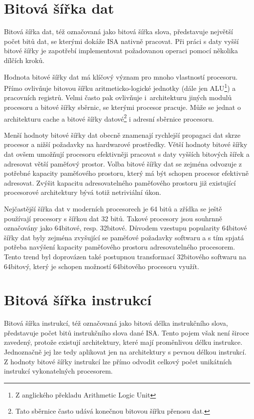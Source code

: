 \documentclass[
  digital, %
  color,   %
  table,   %
  twoside, %
  nolof,   %
  nolot,   %
]{fithesis3}
\begin{document}
\section{Bitová šířka dat}
Bitová šířka dat, též označovaná jako bitová šířka slova, představuje největší počet bitů dat, se kterými dokáže ISA nativně pracovat. Při práci s daty vyšší bitové šířky je zapotřebí implementovat požadovanou operaci pomocí několika dílčích kroků.

Hodnota bitové šířky dat má klíčový význam pro mnoho vlastností procesoru. Přímo ovlivňuje bitovou šířku aritmeticko-logické jednotky (dále jen ALU\footnote{Z anglického překladu Arithmetic Logic Unit}) a pracovních registrů. Velmi často pak ovlivňuje i~architekturu jiných modulů procesoru a bitové šířky sběrnic, se kterými procesor pracuje. Může se jednat o architekturu cache a bitové šířky datové\footnote{Tato sběrnice často udává konečnou bitovou šířku přenosu dat.} i adresní sběrnice procesoru.

Menší hodnoty bitové šířky dat obecně znamenají rychlejší propagaci dat skrze procesor a nižší požadavky na hardwarové prostředky. Větší hodnoty bitové šířky dat ovšem umožňují procesoru efektivněji pracovat s daty vyšších bitových šířek a adresovat větší paměťový prostor. Volba bitové šířky dat se zejména odvozuje z potřebné kapacity paměťového prostoru, který má být schopen procesor efektivně adresovat. Zvýšit kapacitu adresovatelného paměťového prostoru již existující procesorové architektury bývá totiž netriviální úkon.

Nejčastější šířka dat v moderních procesorech je 64 bitů a zřídka se ještě používají procesory s šířkou dat 32 bitů. Takové procesory jsou souhrnně označovány jako 64bitové, resp. 32bitové. Důvodem vzestupu popularity 64bitové šířky dat byly zejména zvyšující se paměťové požadavky softwaru a s tím spjatá potřeba navýšení kapacity paměťového prostoru adresovatelného procesorem. Tento trend byl doprovázen také postupnou transformací 32bitového softwaru na 64bitový, který je schopen možností 64bitového procesoru využít.

\section{Bitová šířka instrukcí}
Bitová šířka instrukcí, též označovaná jako bitová délka instrukčního slova, představuje počet bitů instrukčního slova dané ISA. Tento pojem však není široce zavedený, protože existují architektury, které mají proměnlivou délku instrukce. Jednoznačně jej lze tedy aplikovat jen na architektury s pevnou délkou instrukcí. Z hodnoty bitové šířky instrukcí lze přímo odvodit celkový počet unikátních instrukcí vykonatelných procesorem.
\end{document}
